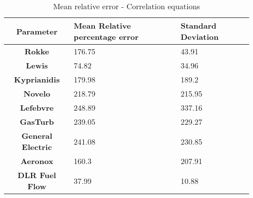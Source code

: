 \begin{table}[h!]
  \centering
  \begin{tabularx}{\textwidth}{||c|X|X||}
  \hline
    \cellcolor{gray!20}\textbf{Parameter} & \cellcolor{gray!20}\textbf{Mean Relative percentage error} & \cellcolor{gray!20}\textbf{Standard Deviation} \\ [0.5ex]
  \hline\hline
\centering
    \cellcolor{gray!20}\textbf{Rokke} & 176.75 & 43.91 \\
  \hline
    \cellcolor{gray!20}\textbf{Lewis} & 74.82 & 34.96 \\
  \hline
    \cellcolor{gray!20}\textbf{Kyprianidis} & 179.98 & 189.2 \\
  \hline
    \cellcolor{gray!20}\textbf{Novelo} & 218.79 & 215.95 \\
  \hline
    \cellcolor{gray!20}\textbf{Lefebvre} & 248.89 & 337.16 \\
  \hline
    \cellcolor{gray!20}\textbf{GasTurb} & 239.05 & 229.27 \\
  \hline
    \cellcolor{gray!20}\textbf{General Electric} & 241.08 & 230.85 \\
  \hline
    \cellcolor{gray!20}\textbf{Aeronox} & 160.3 & 207.91 \\
  \hline
    \cellcolor{gray!20}\textbf{DLR Fuel Flow} & 37.99 & 10.88 \\
  \hline
  \end{tabularx}
  \caption{Mean relative error - Correlation equations}
  \label{meanEC}
\end{table}
